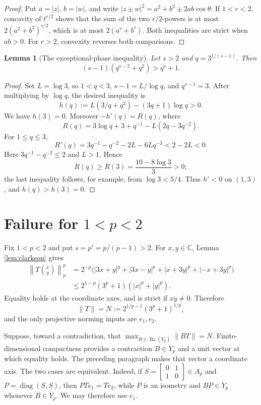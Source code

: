 \documentclass[11pt]{article}
\newtheorem{lemma}{Lemma}
\newcommand{\C}{\mathbb C}
\newcommand{\Ba}{\operatorname{Ba}}
\newcommand{\diag}{\operatorname{diag}}
\begin{document}
\begin{proof}
Put \(a=|z|\), \(b=|w|\), and write
\(|z\pm w|^2=a^2+b^2\pm 2ab\cos\theta\).  If \(1<r<2\), concavity of
\(t^{r/2}\) shows that the sum of the two \(r/2\)-powers is at most
\(2(a^2+b^2)^{r/2}\), which is at most \(2(a^r+b^r)\).  Both inequalities
are strict when \(ab>0\).  For \(r>2\), convexity reverses both comparisons.
\end{proof}

\begin{lemma}[The exceptional-phase inequality]\label{lem:scalar}
Let \(s>2\) and \(q=3^{1/(s-1)}\).  Then
\[
 (s-1)(q^{s-2}+q^2)>q^s+1.
\]
\end{lemma}

\begin{proof}
Set \(L=\log 3\), so \(1<q<3\), \(s-1=L/\log q\), and \(q^{s-1}=3\).
After multiplying by \(\log q\), the desired inequality is
\[
 h(q):=L(3/q+q^2)-(3q+1)\log q>0.
\]
We have \(h(3)=0\).  Moreover \(-h'(q)=R(q)\), where
\[
 R(q)=3\log q+3+q^{-1}-L(2q-3q^{-2}).
\]
For \(1\le q\le3\),
\[
 R'(q)=3q^{-1}-q^{-2}-2L-6Lq^{-3}<2-2L<0.
\]
Here \(3q^{-1}-q^{-2}\le2\) and \(L>1\).  Hence
\[
 R(q)\ge R(3)=\frac{10-8\log3}{3}>0;
\]
the last inequality follows, for example, from \(\log3<5/4\).
Thus \(h'<0\) on \((1,3)\), and \(h(q)>h(3)=0\).
\end{proof}

\section{Failure for \(1<p<2\)}

Fix \(1<p<2\) and put \(s=p'=p/(p-1)>2\).  For \(x,y\in\C\), Lemma
\ref{lem:clarkson} gives
\begin{align*}
 \left\|T\binom{x}{y}\right\|_p^p
 &=2^{-p}\bigl(|3x+y|^p+|3x-y|^p
       +|x+3y|^p+|-x+3y|^p\bigr)\\
 &\le 2^{1-p}(3^p+1)(|x|^p+|y|^p).
\end{align*}
Equality holds at the coordinate axes, and is strict if \(xy\ne0\).  Therefore
\begin{equation}\label{eq:Tnorm}
 \|T\|=N:=2^{1/p-1}(3^p+1)^{1/p},
\end{equation}
and the only projective norming inputs are \(e_1,e_2\).

Suppose, toward a contradiction, that
\(\max_{B\in\Ba(Y_p)}\|BT\|=N\).  Finite-dimensional compactness provides
a contraction \(B\in Y_p\) and a unit vector at which equality holds.  The
preceding paragraph makes that vector a coordinate axis.  The two cases are
equivalent.  Indeed, if
\(S=\begin{bmatrix}0&1\\1&0\end{bmatrix}\in A_p\) and
\(P=\diag(S,S)\), then \(PTe_1=Te_2\), while \(P\) is an isometry and
\(BP\in Y_p\) whenever \(B\in Y_p\).  We may therefore use \(e_1\).
\end{document}
